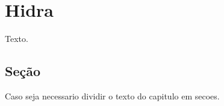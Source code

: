 \chapter{Hidra} \label{chapter:hidra}

Texto.

\section{Seção} \label{section:sec1}

Caso seja necessario dividir o texto do capitulo em secoes.